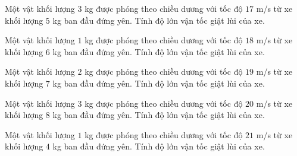 \begin{ex}
Một vật khối lượng $3$ kg được phóng theo chiều dương với tốc độ $17$ m/s từ xe khối lượng $5$ kg ban đầu đứng yên. Tính độ lớn vận tốc giật lùi của xe.
\end{ex}

\begin{ex}
Một vật khối lượng $1$ kg được phóng theo chiều dương với tốc độ $18$ m/s từ xe khối lượng $6$ kg ban đầu đứng yên. Tính độ lớn vận tốc giật lùi của xe.
\end{ex}

\begin{ex}
Một vật khối lượng $2$ kg được phóng theo chiều dương với tốc độ $19$ m/s từ xe khối lượng $7$ kg ban đầu đứng yên. Tính độ lớn vận tốc giật lùi của xe.
\end{ex}

\begin{ex}
Một vật khối lượng $3$ kg được phóng theo chiều dương với tốc độ $20$ m/s từ xe khối lượng $8$ kg ban đầu đứng yên. Tính độ lớn vận tốc giật lùi của xe.
\end{ex}

\begin{ex}
Một vật khối lượng $1$ kg được phóng theo chiều dương với tốc độ $21$ m/s từ xe khối lượng $4$ kg ban đầu đứng yên. Tính độ lớn vận tốc giật lùi của xe.
\end{ex}

